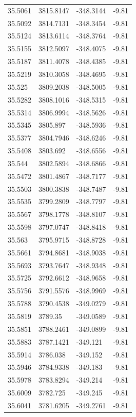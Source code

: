 \begin{table}[H]
\begin{tabular}{llll}
35.5061 & 3815.8147 & -348.3144 & -9.81 \\
35.5092 & 3814.7131 & -348.3454 & -9.81 \\
35.5124 & 3813.6114 & -348.3764 & -9.81 \\
35.5155 & 3812.5097 & -348.4075 & -9.81 \\
35.5187 & 3811.4078 & -348.4385 & -9.81 \\
35.5219 & 3810.3058 & -348.4695 & -9.81 \\
35.525 & 3809.2038 & -348.5005 & -9.81 \\
35.5282 & 3808.1016 & -348.5315 & -9.81 \\
35.5314 & 3806.9994 & -348.5626 & -9.81 \\
35.5345 & 3805.897 & -348.5936 & -9.81 \\
35.5377 & 3804.7946 & -348.6246 & -9.81 \\
35.5408 & 3803.692 & -348.6556 & -9.81 \\
35.544 & 3802.5894 & -348.6866 & -9.81 \\
35.5472 & 3801.4867 & -348.7177 & -9.81 \\
35.5503 & 3800.3838 & -348.7487 & -9.81 \\
35.5535 & 3799.2809 & -348.7797 & -9.81 \\
35.5567 & 3798.1778 & -348.8107 & -9.81 \\
35.5598 & 3797.0747 & -348.8418 & -9.81 \\
35.563 & 3795.9715 & -348.8728 & -9.81 \\
35.5661 & 3794.8681 & -348.9038 & -9.81 \\
35.5693 & 3793.7647 & -348.9348 & -9.81 \\
35.5725 & 3792.6612 & -348.9658 & -9.81 \\
35.5756 & 3791.5576 & -348.9969 & -9.81 \\
35.5788 & 3790.4538 & -349.0279 & -9.81 \\
35.5819 & 3789.35 & -349.0589 & -9.81 \\
35.5851 & 3788.2461 & -349.0899 & -9.81 \\
35.5883 & 3787.1421 & -349.121 & -9.81 \\
35.5914 & 3786.038 & -349.152 & -9.81 \\
35.5946 & 3784.9338 & -349.183 & -9.81 \\
35.5978 & 3783.8294 & -349.214 & -9.81 \\
35.6009 & 3782.725 & -349.245 & -9.81 \\
35.6041 & 3781.6205 & -349.2761 & -9.81 \\

\end{tabular}
\end{table}
